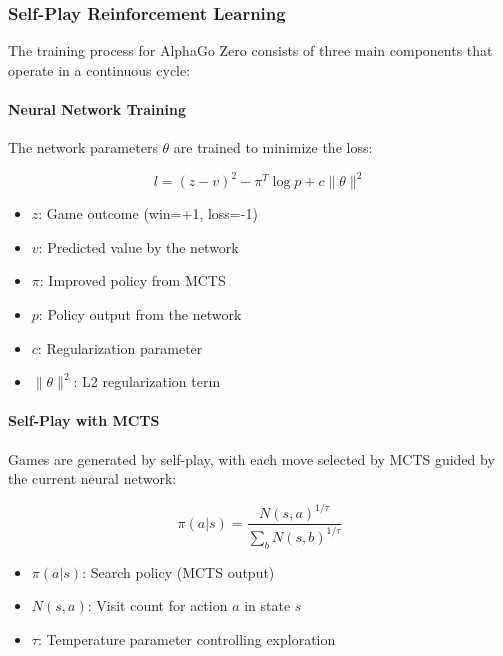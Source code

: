 \documentclass[11pt]{article}
\begin{document}
\subsubsection{Self-Play Reinforcement Learning}

The training process for AlphaGo Zero consists of three main components that operate in a continuous cycle:

\paragraph{Neural Network Training}
The network parameters $\theta$ are trained to minimize the loss:

\begin{equation}
    l = (z - v)^2 - \pi^T \log p + c\|\theta\|^2
\end{equation}

\begin{tcolorbox}[title=Notation Overview]
\begin{itemize}
    \item $z$: Game outcome (win=+1, loss=-1)
    \item $v$: Predicted value by the network
    \item $\pi$: Improved policy from MCTS
    \item $p$: Policy output from the network
    \item $c$: Regularization parameter
    \item $\|\theta\|^2$: L2 regularization term
\end{itemize}
\end{tcolorbox}

\paragraph{Self-Play with MCTS}
Games are generated by self-play, with each move selected by MCTS guided by the current neural network:

\begin{equation}
    \pi(a|s) = \frac{N(s, a)^{1/\tau}}{\sum_b N(s, b)^{1/\tau}}
\end{equation}

\begin{tcolorbox}[title=Notation Overview]
\begin{itemize}
    \item $\pi(a|s)$: Search policy (MCTS output)
    \item $N(s, a)$: Visit count for action $a$ in state $s$
    \item $\tau$: Temperature parameter controlling exploration
\end{itemize}
\end{tcolorbox}
\end{document}
